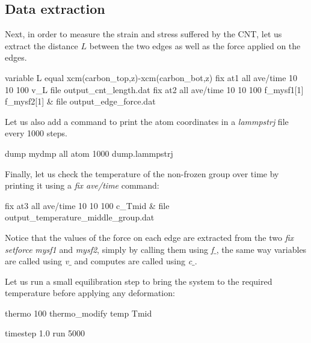 \subsection{Data extraction}
Next, in order to measure the strain and stress suffered by the
CNT, let us extract the distance $L$ between
the two edges as well as the force applied on the edges.

\begin{lcverbatim}
variable L equal xcm(carbon_top,z)-xcm(carbon_bot,z)
fix at1 all ave/time 10 10 100 v_L file output_cnt_length.dat
fix at2 all ave/time 10 10 100 f_mysf1[1] f_mysf2[1] &
    file output_edge_force.dat
\end{lcverbatim}

\noindent Let us also add a command to print the atom coordinates in a
\textit{lammpstrj} file every 1000 steps.

\begin{lcverbatim}
dump mydmp all atom 1000 dump.lammpstrj
\end{lcverbatim}

\noindent Finally, let us check the temperature of the non-frozen group over time
by printing it using a \textit{fix ave/time} command:

\begin{lcverbatim}
fix at3 all ave/time 10 10 100 c_Tmid &
    file output_temperature_middle_group.dat
\end{lcverbatim}

\noindent \begin{tcolorbox}[colback=mylightblue!5!white,colframe=mylightblue!75!black,title=About extracting quantity from variable compute or fix]

\vspace{0.25cm} \noindent Notice that the values of the force on each edge are
extracted from the two \textit{fix setforce} \textit{mysf1} and \textit{mysf2}, simply by
calling them using \textit{f$\_$}, the same way variables are called
using \textit{v$\_$} and computes are called using \textit{c$\_$}.
\end{tcolorbox}

\noindent Let us run a small equilibration step to bring the system 
to the required temperature before applying any deformation:

\begin{lcverbatim}
thermo 100
thermo_modify temp Tmid

timestep 1.0
run 5000
\end{lcverbatim}

